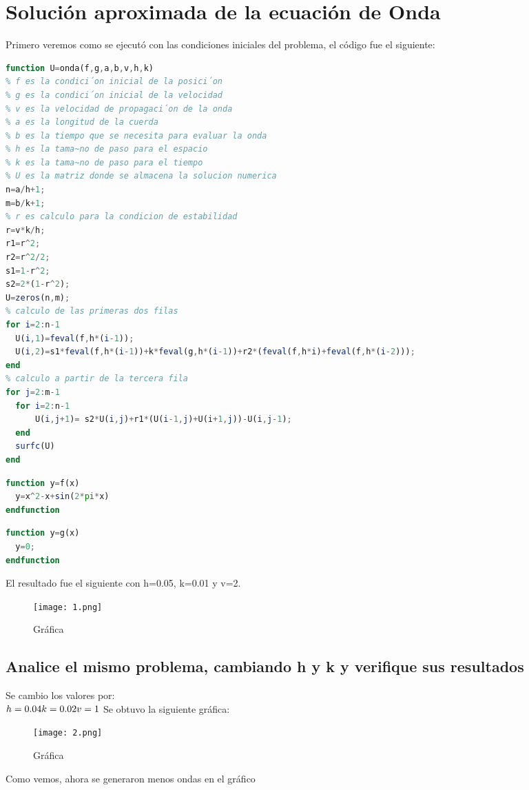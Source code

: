 \documentclass{article}
\begin{document}
\section{ Solución aproximada de la ecuación de Onda}
Primero veremos como se ejecutó con las condiciones iniciales del problema, el código fue el siguiente:
\begin{lstlisting}[language=octave,caption=onda.m]
function U=onda(f,g,a,b,v,h,k)
% f es la condici´on inicial de la posici´on
% g es la condici´on inicial de la velocidad
% v es la velocidad de propagaci´on de la onda
% a es la longitud de la cuerda
% b es la tiempo que se necesita para evaluar la onda
% h es la tama~no de paso para el espacio
% k es la tama~no de paso para el tiempo
% U es la matriz donde se almacena la solucion numerica
n=a/h+1;
m=b/k+1;
% r es calculo para la condicion de estabilidad
r=v*k/h;
r1=r^2;
r2=r^2/2;
s1=1-r^2;
s2=2*(1-r^2);
U=zeros(n,m);
% calculo de las primeras dos filas
for i=2:n-1
  U(i,1)=feval(f,h*(i-1));
  U(i,2)=s1*feval(f,h*(i-1))+k*feval(g,h*(i-1))+r2*(feval(f,h*i)+feval(f,h*(i-2)));
end
% calculo a partir de la tercera fila
for j=2:m-1
  for i=2:n-1
      U(i,j+1)= s2*U(i,j)+r1*(U(i-1,j)+U(i+1,j))-U(i,j-1);
  end
  surfc(U)
end
\end{lstlisting}
\begin{lstlisting}[language=octave,caption=fx.m]
function y=f(x)
  y=x^2-x+sin(2*pi*x)
endfunction
\end{lstlisting}
\begin{lstlisting}[language=octave,caption=gx.m]
function y=g(x)
  y=0;
endfunction
\end{lstlisting}
El resultado fue el siguiente con h=0.05, k=0.01 y v=2.
\begin{figure}[H]
    \centering
    \texttt{[image: 1.png]}
    \caption{Gráfica}
\end{figure}
\subsection{Analice el mismo problema, cambiando h y k y verifique sus resultados}
Se cambio los valores por:\\
$
h = 0.04\\
k = 0.02\\
v = 1\\
$
Se obtuvo la siguiente gráfica:
\begin{figure}[H]
    \centering
    \texttt{[image: 2.png]}
    \caption{Gráfica}
\end{figure}
Como vemos, ahora se generaron menos ondas en el gráfico
\end{document}

